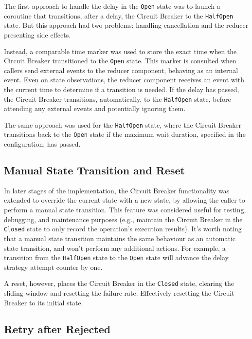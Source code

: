 The first approach to handle the delay in the \texttt{Open} state was
to launch a coroutine that transitions, after a delay, the Circuit Breaker to the \texttt{HalfOpen} state.
But this approach had two problems: handling cancellation and the reducer presenting side effects.

Instead,
a comparable time marker was used to store the exact time when the Circuit Breaker transitioned to the \texttt{Open} state.
This marker is consulted when callers send external events to the reducer component,
behaving as an internal event.
Even on state observations, the reducer component receives an event with the current time to determine if a transition is needed.
If the delay has passed, the Circuit Breaker transitions, automatically, to the \texttt{HalfOpen} state,
before attending any external events and potentially ignoring them.

The same approach was used for the \texttt{HalfOpen} state,
where the Circuit Breaker transitions back to the \texttt{Open} state
if the maximum wait duration, specified in the configuration, has passed.

\subsection{Manual State Transition and Reset}\label{subsec:cbreaker-manual-state-transition}

In later stages of the implementation, the Circuit Breaker functionality was extended to override the current state with a new state,
by allowing the caller to perform a manual state transition.
This feature was considered useful for testing, debugging,
and maintenance purposes (e.g., maintain the Circuit Breaker in the \texttt{Closed} state to only record the operation's execution results).
It's worth noting that a manual state transition maintains the same behaviour as an automatic state transition,
and won't perform any additional actions.
For example,
a transition from the \texttt{HalfOpen} state to the \texttt{Open} state will advance the delay strategy attempt counter by one.

A reset, however, places the Circuit Breaker in the \texttt{Closed} state,
clearing the sliding window and resetting the failure rate.
Effectively resetting the Circuit Breaker to its initial state.

\subsection{Retry after Rejected}\label{subsec:cbreaker-retry-after-rejected}

